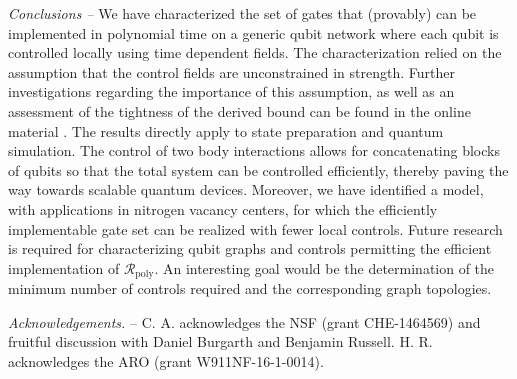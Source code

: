 \documentclass[aps,twocolumn,amsmath,amssymb,nofootinbib,superscriptaddress]{revtex4-1}
\begin{document}
\emph{Conclusions --}
We have characterized the set of gates that (provably) can be implemented in polynomial time on a generic qubit network where each qubit is controlled locally using time dependent fields. The characterization relied on the assumption that the control fields are unconstrained in strength. Further investigations regarding the importance of this assumption, as well as an assessment of the tightness of the derived bound can be found in the online material \cite{OnlineMaterial}. The results directly apply to state preparation and quantum simulation.   
The control of two body interactions allows for concatenating blocks of qubits so that the total system can be controlled efficiently, thereby paving the way towards scalable quantum devices. Moreover, we have identified a model, with applications in nitrogen vacancy centers, for which the efficiently implementable gate set can be realized with fewer local controls. 
 Future research is required for characterizing qubit graphs and controls permitting the efficient implementation of $\mathcal R_{\text{poly}}$. An interesting goal would be the determination of the minimum number of controls required and the corresponding graph topologies.
    
     
\newpage

{\em Acknowledgements.} -- C. A. acknowledges the NSF (grant CHE-1464569) and fruitful discussion with Daniel Burgarth and Benjamin Russell. H. R. acknowledges the ARO (grant W911NF-16-1-0014).





\end{document}
